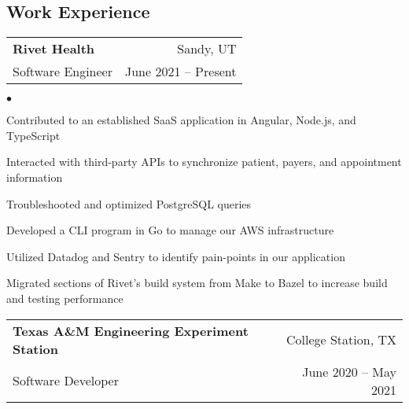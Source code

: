 \documentclass[margin, 11pt]{res}
\makeatletter
\newcommand{\li}{https://linkedin.com/in/jakegut}
\newcommand{\gh}{https://github.com/jakegut}
\newcommand{\personalsite}{https://jakegut.com}
\newcommand{\resumeSubheading}[4]{

\begin{tabular*}{1.01\textwidth}{@{\hspace{-4pt}}l @{\extracolsep{\fill}} r}
\textbf{#1} & #2 \\
      {#3} &  {#4}
\end{tabular*}\vspace{-2pt}
}
\newenvironment{list2}{
	\begin{list}{$\bullet$}{%
	    \small
		\setlength{\itemsep}{0in}
		\setlength{\parsep}{0in} \setlength{\parskip}{0in}
		\setlength{\topsep}{0in} \setlength{\partopsep}{0in}
		\setlength{\leftmargin}{0.2in}}}{\end{list}}
\makeatother
\begin{document}
\address{
    \small 979-676-3030 $|$ 
    \href{mailto:jakegut0108@gmail.com}{jakegut0108@gmail.com} $|$ 
    \href{\li}{linkedin.com/in/jakegut} $|$
    \href{\gh}{github.com/jakegut}
}

\begin{resume}

\section{\sc Work Experience}

\vspace{2pt}
                 
\resumeSubheading{{\bf Rivet Health}}{Sandy, UT}
                 {Software Engineer}{June 2021 -- Present}
                 
\begin{list2}
\item{Contributed to an established SaaS application in Angular, Node.js, and TypeScript}
\item{Interacted with third-party APIs to synchronize patient, payers, and appointment information}
\item{Troubleshooted and optimized PostgreSQL queries}
\item{Developed a CLI program in Go to manage our AWS infrastructure}
\item{Utilized Datadog and Sentry to identify pain-points in our application}
\item{Migrated sections of Rivet's build system from Make to Bazel to increase build and testing performance}
\end{list2}

\resumeSubheading{{\bf Texas A\&M Engineering Experiment Station}}{College Station, TX}
                 {Software Developer}{June 2020 -- May 2021}


\end{resume}
\end{document}
